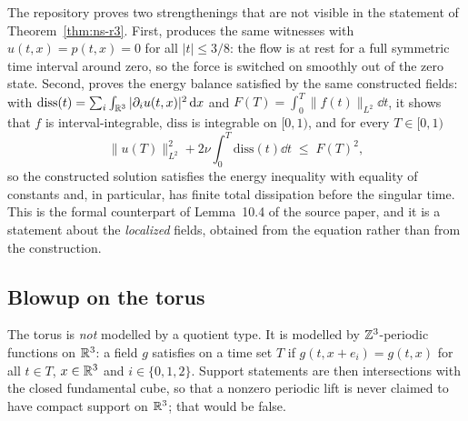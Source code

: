 \begin{remark}
\label{rem:r3-refine}
The repository proves two strengthenings that are not visible in the statement of
Theorem~\ref{thm:ns-r3}. First,  produces the same
witnesses with $u(t,x)=p(t,x)=0$ for all $|t|\le 3/8$: the flow is at rest for a full
symmetric time interval around zero, so the force is switched on smoothly out of the
zero state. Second,  proves the energy balance satisfied by the
same constructed fields: with
$\mathrm{diss}(t)=\sum_{i}\int_{\mathbb{R}^3}|\partial_i u(t,x)|^2\,\mathrm{d} x$ and
$F(T)=\int_0^T\|f(t)\|_{L^2}\dd t$, it shows that $f$ is interval-integrable,
$\mathrm{diss}$ is integrable on $[0,1)$, and for every $T\in[0,1)$
\[
  \|u(T)\|_{L^2}^2 + 2\nu\int_0^T \mathrm{diss}(t)\dd t \;\le\; F(T)^2 ,
\]
so the constructed solution satisfies the energy inequality with equality of constants and,
in particular, has finite total dissipation before the singular time. This is the
formal counterpart of Lemma~10.4 of the source paper, and it is a statement about the
\emph{localized} fields, obtained from the equation rather than from the construction.
\end{remark}

\subsection{Blowup on the torus}
\label{sec:torus}

The torus is \emph{not} modelled by a quotient type. It is modelled by
$\mathbb{Z}^3$-periodic functions on $\mathbb{R}^3$: a field $g$ satisfies 
on a time set $T$ if $g(t,x+e_i)=g(t,x)$ for all $t\in T$, $x\in\mathbb{R}^3$ and
$i\in\{0,1,2\}$. Support statements are then intersections with the closed fundamental
cube, so that a nonzero periodic lift is never claimed to have compact support on
$\mathbb{R}^3$; that would be false.

